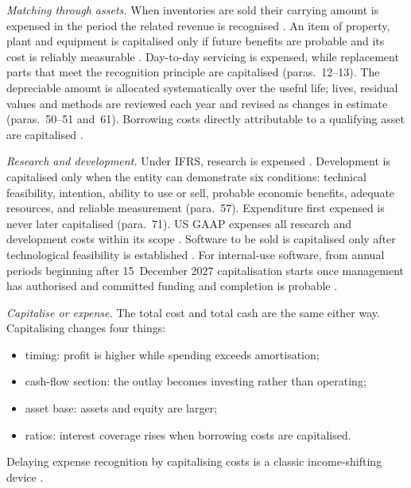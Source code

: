 \begin{qfmethod}\label{meth:expense-recognition-capitalisation}
 \emph{Matching through assets.} When inventories are sold their carrying amount is expensed in the period the related revenue is recognised \citep[IAS~2 para.~34]{eu-2023-1803-ias2}. An item of property, plant and equipment is capitalised only if future benefits are probable and its cost is reliably measurable \citep[IAS~16 para.~7]{eu-2023-1803-ias16}. Day-to-day servicing is expensed, while replacement parts that meet the recognition principle are capitalised (paras.~12--13). The depreciable amount is allocated systematically over the useful life; lives, residual values and methods are reviewed each year and revised as changes in estimate (paras.~50--51 and~61). Borrowing costs directly attributable to a qualifying asset are capitalised \citep[IAS~23 para.~8]{eu-2023-1803-ias23}.

\emph{Research and development.} Under IFRS, research is expensed \citep[IAS~38 para.~54]{eu-2023-1803-ias38}. Development is capitalised only when the entity can demonstrate six conditions: technical feasibility, intention, ability to use or sell, probable economic benefits, adequate resources, and reliable measurement (para.~57). Expenditure first expensed is never later capitalised (para.~71). US GAAP expenses all research and development costs within its scope \citep[para.~12]{us-research-development-1974}. Software to be sold is capitalised only after technological feasibility is established \citep[paras.~3--4]{us-software-1985}. For internal-use software, from annual periods beginning after 15~December 2027 capitalisation starts once management has authorised and committed funding and completion is probable \citep[pp.~2--3]{us-software-2025}.

\emph{Capitalise or expense.} The total cost and total cash are the same either way. Capitalising changes four things:
\begin{itemize}
\item timing: profit is higher while spending exceeds amortisation;
\item cash-flow section: the outlay becomes investing rather than operating;
\item asset base: assets and equity are larger;
\item ratios: interest coverage rises when borrowing costs are capitalised.
\end{itemize}
Delaying expense recognition by capitalising costs is a classic income-shifting device \citep[pp.~110--111]{financial-statement-analysis-2009}.


\end{qfmethod}
